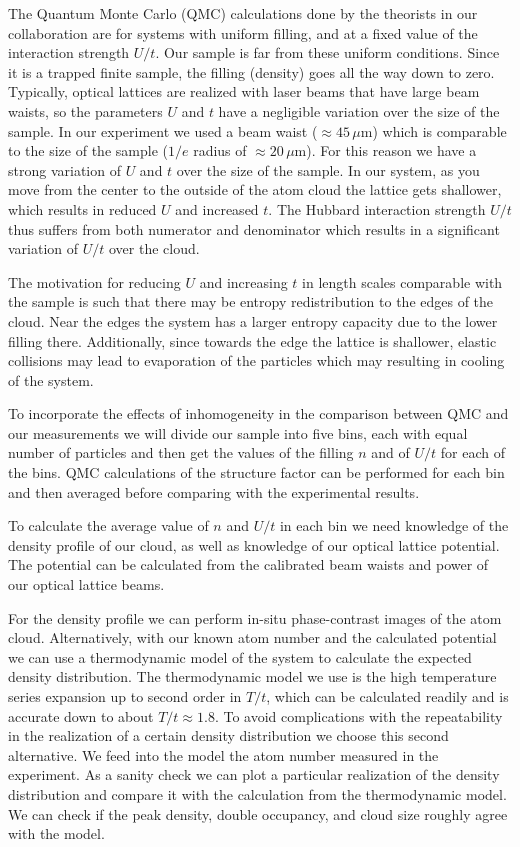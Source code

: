 \documentclass[11pt,letter]{article}
\begin{document}
The Quantum Monte Carlo (QMC) calculations done by the theorists in our
collaboration are for systems with uniform filling, and at a fixed value of the
interaction strength $U/t$. Our sample is far from these uniform conditions.
Since it is a trapped finite sample, the filling (density) goes all the way
down to zero.  Typically, optical lattices are realized with laser beams that
have large beam waists, so the parameters $U$ and $t$ have a negligible
variation over the size of the sample.  In our experiment we used a beam waist
($\approx 45\,\mu\text{m}$) which is comparable to the size of the sample
($1/e$ radius of $\approx 20\,\mu\text{m}$).   For this reason we have a strong
variation of $U$ and $t$ over the size of the sample.  In our system, as you
move from the center to the outside of the atom cloud the lattice gets
shallower, which results in reduced $U$ and increased $t$.   The Hubbard
interaction strength $U/t$ thus suffers from both numerator and denominator
which results in a significant variation of $U/t$ over the cloud. 

The motivation for reducing $U$ and increasing $t$ in length scales comparable
with the sample is such that there may be entropy redistribution to the edges
of the cloud.  Near the edges the system has a larger entropy capacity due to
the lower filling there. Additionally,  since towards the edge the lattice is
shallower, elastic collisions may lead to evaporation of the particles which
may resulting in cooling of the system. 

To incorporate the effects of inhomogeneity in the comparison between QMC and
our measurements we will divide our sample into five bins, each with equal
number of particles and then get the values of the filling $n$ and of $U/t$ for
each of the bins.  QMC calculations of the structure factor can be performed for
each bin and then averaged before comparing with the experimental results. 

To calculate the average value of $n$ and $U/t$ in each bin we need knowledge
of the density profile of our cloud, as well as knowledge of our optical
lattice potential. The potential can be calculated from the calibrated beam
waists and power of our optical lattice beams.   

For the density profile we can perform in-situ phase-contrast images of the
atom cloud.  Alternatively,  with our known atom number and the calculated
potential we can use a thermodynamic model of the system to calculate the
expected density distribution.   The thermodynamic model we use is the high
temperature series expansion up to second order in $T/t$, which can be
calculated readily and is accurate down to about $T/t \approx 1.8$.   To avoid
complications with the repeatability in the realization of a certain density
distribution we choose this second alternative.  We feed into the model the
atom number measured in the experiment. As a sanity check we can plot a
particular realization of the density distribution and compare it with the
calculation from the thermodynamic model.  We can check if the peak density,
double occupancy, and cloud size roughly agree with the model. 
\end{document}
